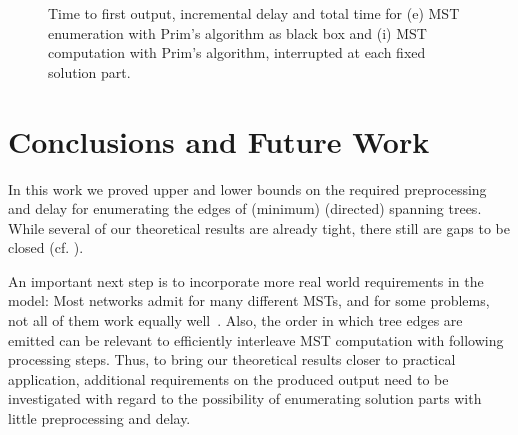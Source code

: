 \documentclass[a4paper, USenglish, cleveref, autoref, thm-restate]{lipics-v2021}
\begin{document}
\begin{figure}[t]
	\caption{Time to first output, incremental delay and total time for (e) MST enumeration with Prim's algorithm as black box and (i) MST computation with Prim's algorithm, interrupted at each fixed solution part.}
	\label{fig:prim-experiments}
\end{figure}

\section{Conclusions and Future Work}
\label{sec:future-work}

In this work we proved upper and lower bounds on the required preprocessing and delay for enumerating the edges of (minimum) (directed) spanning trees.
While several of our theoretical results are already tight, there still are gaps to be closed (cf. ).

An important next step is to incorporate more real world requirements in the model:
Most networks admit for many different MSTs, and for some problems, not all of them work equally well~\cite{agmonGivingTreeConstructing2008}.
Also, the order in which tree edges are emitted can be relevant to efficiently interleave MST computation with following processing steps.
Thus, to bring our theoretical results closer to practical application, additional requirements on the produced output need to be investigated with regard to the possibility of enumerating solution parts with little preprocessing and delay.



\end{document}
